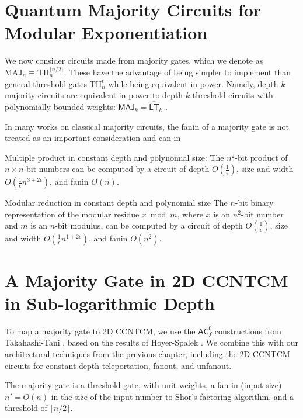 \section{Quantum Majority Circuits for Modular Exponentiation}

We now consider circuits made from majority gates, which we denote
as $\text{MAJ}_n \equiv \text{TH}^{\lceil n/2 \rceil}_n$. These have the
advantage of being simpler to implement than general threshold gates
$\text{TH}^t_n$ while being equivalent in power. Namely, depth-$k$
majority circuits are equivalent in power to depth-$k$ threshold circuits
with polynomially-bounded weights: $\textsf{MAJ}_k = \hat{\textsf{LT}}_k$
\cite{Alon1994,Goldmann1994}.

In many works on classical majority circuits, the fanin of a majority
gate is not treated as an important consideration and can in 

\begin{theorem}{Multiple product in constant depth and polynomial size: \cite{Yeh1996}}
The $n^2$-bit product of $n\times n$-bit numbers can be computed by a
circuit of depth $O(\frac{1}{\epsilon})$,
size and width $O(\frac{1}{\epsilon}n^{3+2\epsilon})$, and
fanin $O(n)$.
\end{theorem}

\begin{theorem}{Modular reduction in constant depth and polynomial size \cite{Yeh1996}}
The $n$-bit binary representation of the modular residue $x \bmod m$, where
$x$ is an $n^2$-bit number and $m$ is an $n$-bit modulus, can be computed
by a circuit of depth $O(\frac{1}{\epsilon})$,
size and width $O(\frac{1}{\epsilon}n^{1 + 2\epsilon})$, and
fanin $O(n^2)$.
\end{theorem}



\section{A Majority Gate in 2D CCNTCM in Sub-logarithmic Depth}

To map a majority gate to 2D CCNTCM, we use the $\textsf{AC}_f^0$ 
constructions from Takahashi-Tani \cite{Takahashi2011},
based on the results of
Hoyer-Spalek \cite{Hoyer2002}.
We combine this with our architectural techniques
from the previous chapter, including the 2D CCNTCM circuits
for constant-depth teleportation, fanout, and unfanout.

The majority gate is a threshold gate, with unit weights, a
fan-in (input size) $n' = O(n)$ in the size of the input number to Shor's 
factoring algorithm, and a threshold of $\lceil n/2 \rceil$.


